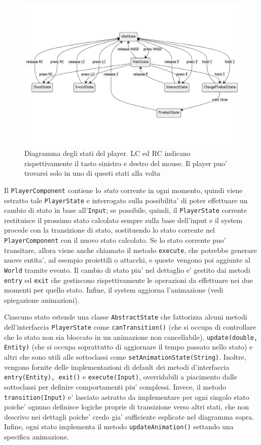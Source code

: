 \documentclass[a4paper,12pt]{report}
\begin{document}
\begin{figure}[h]
	\centering
	\includegraphics[width=\textwidth]{uml/player_states.png}
	\caption{Diagramma degli stati del player. LC ed RC indicano rispettivamente il tasto sinistro e destro del mouse. Il player puo' trovarsi solo in uno di questi stati alla volta} 
\end{figure}

Il \texttt{PlayerComponent} contiene lo \textit{stato} corrente in ogni momento, quindi viene estratto tale \texttt{PlayerState} e interrogato sulla possibilita' di poter effettuare un cambio di stato in base all'\texttt{Input}; se possibile, quindi, il \texttt{PlayerState} corrente restituisce il prossimo stato calcolato sempre sulla base dell'input e il system procede con la transizione di stato, sostituendo lo stato corrente nel \texttt{PlayerComponent} con il nuovo stato calcolato. Se lo stato corrente puo' transitare, allora viene anche chiamato il metodo \texttt{execute}, che potrebbe generare nuove entita', ad esempio proiettili o attacchi, e queste vengono poi aggiunte al \texttt{World} tramite evento. Il cambio di stato piu' nel dettaglio e' gestito dai metodi \texttt{entry} ed \texttt{exit} che gestiscono rispettivamente le operazioni da effettuare nei due momenti per quello stato. Infine, il system aggiorna l'animazione (vedi spiegazione animazioni). 

Ciascuno stato estende una classe \texttt{AbstractState} che fattorizza alcuni metodi dell'interfaccia \texttt{PlayerState} come \texttt{canTransition()} (che si occupa di controllare che lo stato non sia bloccato in un animazione non cancellabile), \texttt{update(double, Entity)} (che si occupa soprattutto di aggiornare il tempo passato nello stato) e altri che sono utili alle sottoclassi come \texttt{setAnimationState(String)}. Inoltre, vengono fornite delle implementazioni di default dei metodi d'interfaccia \texttt{entry(Entity), \texttt{exit()}} e \texttt{execute(Input)}, overridabili a piacimento dalle sottoclassi per definire comportamenti piu' complessi. Invece, il metodo \texttt{transition(Input)} e' lasciato astratto da implementare per ogni singolo stato poiche' ognuno definisce logiche proprie di transizione verso altri stati, che non descrivo nei dettagli poiche' credo gia' sufficiente esplicate nel diagramma sopra. Infine, ogni stato implementa il metodo \texttt{updateAnimation()} settando una specifica animazione.
\end{document}

